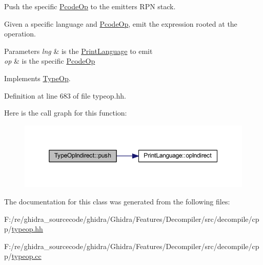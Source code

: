 Push the specific \mbox{\hyperlink{class_pcode_op}{Pcode\+Op}} to the emitter\textquotesingle{}s R\+PN stack. 

Given a specific language and \mbox{\hyperlink{class_pcode_op}{Pcode\+Op}}, emit the expression rooted at the operation. 
\begin{DoxyParams}{Parameters}
{\em lng} & is the \mbox{\hyperlink{class_print_language}{Print\+Language}} to emit \\
\hline
{\em op} & is the specific \mbox{\hyperlink{class_pcode_op}{Pcode\+Op}} \\
\hline
\end{DoxyParams}


Implements \mbox{\hyperlink{class_type_op_ac9c9544203ed74dabe6ac662b653b2af}{Type\+Op}}.



Definition at line 683 of file typeop.\+hh.

Here is the call graph for this function\+:
\nopagebreak
\begin{figure}[H]
\begin{center}
\leavevmode
\includegraphics[width=350pt]{class_type_op_indirect_a6c1d09459f194501368fd07d9fccc124_cgraph}
\end{center}
\end{figure}


The documentation for this class was generated from the following files\+:\begin{DoxyCompactItemize}
\item 
F\+:/re/ghidra\+\_\+sourcecode/ghidra/\+Ghidra/\+Features/\+Decompiler/src/decompile/cpp/\mbox{\hyperlink{typeop_8hh}{typeop.\+hh}}\item 
F\+:/re/ghidra\+\_\+sourcecode/ghidra/\+Ghidra/\+Features/\+Decompiler/src/decompile/cpp/\mbox{\hyperlink{typeop_8cc}{typeop.\+cc}}\end{DoxyCompactItemize}
